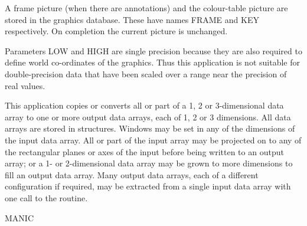 {{{{         \sstitem
         A frame picture (when there are annotations) and the
         colour-table picture are stored in the graphics database. These
         have names FRAME and KEY respectively.  On completion the
         current picture is unchanged.

         \sstitem
         Parameters LOW and HIGH are single precision because they are
         also required to define world co-ordinates of the graphics.  Thus
         this application is not suitable for double-precision data that
         have been scaled over a range near the precision of real values.
      }
   }
}


\begin{manroutinedescription}
  This application copies or converts all or part of a 1, 2 or
  3-dimensional data array to one or more output data arrays, each
  of 1, 2 or 3 dimensions. All data arrays are stored in {}
  structures. Windows may be set in any of the dimensions of the
  input data array. All or part of the input array may be projected
  on to any of the rectangular planes or axes of the input before
  being written to an output array; or a 1- or 2-dimensional data
  array may be grown to more dimensions to fill an output data
  array. Many output data arrays, each of a different configuration
  if required, may be extracted from a single input data array with
  one call to the routine.

  MANIC


\end{manroutinedescription}}

